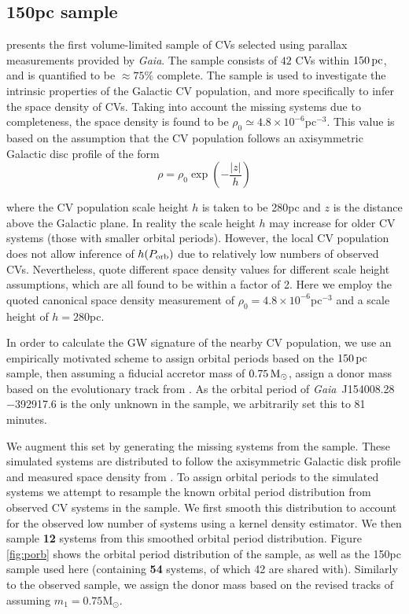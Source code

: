 \documentclass[fleqn,usenatbib]{mnras}
\newcommand{\gaia}{{\it Gaia}}
\begin{document}
\subsection{150pc sample} \label{sec:150pc}

\cite{pala20} presents the first volume-limited sample of CVs selected using parallax measurements provided by \gaia. The sample consists of $42$ CVs within $150\,\rm{pc}$, and is quantified to be $\approx 75\%$ complete. The sample is used to investigate the intrinsic properties of the Galactic CV population, and more specifically to infer the space density of CVs. Taking into account the missing systems due to completeness, the space density is found to be $\rho_0\simeq4.8 \times 10^{-6}$pc$^{-3}$. This value is based on the assumption that the CV population follows an axisymmetric Galactic disc profile of the form
\begin{equation}
\label{eq:disk}
    \rho = \rho_{0} \exp \left(-\frac{|z|}{h}\right)
\end{equation}

\noindent where the CV population scale height $h$ is taken to be 280pc and $z$ is the distance above the Galactic plane. In reality the scale height $h$ may increase for older CV systems (those with smaller orbital periods). However, the local CV population does not allow inference of $h(P_{\rm{orb}})$ due to relatively low numbers of observed CVs. Nevertheless, \cite{pala20} quote different space density values for different scale height assumptions, which are all found to be within a factor of 2. Here we employ the quoted canonical space density measurement of $\rho_0=4.8 \times 10^{-6}$pc$^{-3}$ and a scale height of $h=280$pc.

In order to calculate the GW signature of the nearby CV population, we use an empirically motivated scheme to assign orbital periods based on the \citet{pala20} $150\,\rm{pc}$ sample, then assuming a fiducial accretor mass of $0.75\,\rm{M_{\odot}}$, assign a donor mass based on the evolutionary track from \citet{knigge11}. As the orbital period of \gaia\ J154008.28$-$392917.6 is the only unknown in the sample, we arbitrarily set this to 81 minutes. 

We augment this set by generating the missing systems from the \cite{pala20} sample. These simulated systems are distributed to follow the axisymmetric Galactic disk profile and measured space density from \cite{pala20}. To assign orbital periods to the simulated systems we attempt to resample the known orbital period distribution from observed CV systems in the \cite{pala20} sample. We first smooth this distribution to account for the observed low number of systems using a kernel density estimator. We then sample \textbf{12} systems from this smoothed orbital period distribution. Figure \ref{fig:porb} shows the orbital period distribution of the \cite{pala20} sample, as well as the 150pc sample used here (containing \textbf{54} systems, of which 42 are shared with\cite{pala20}). Similarly to the observed sample, we assign the donor mass based on the revised tracks of \cite{knigge11} assuming $m_1=0.75$M$_{\odot}$.
\end{document}
